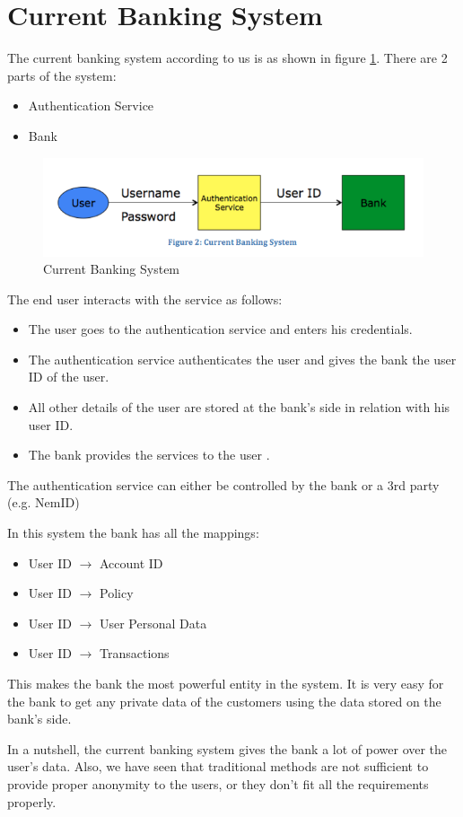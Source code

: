 \section{Current Banking System}
The current banking system according to us is as shown in figure \ref{fig:Current}. There are 2 parts of the system:
\begin{itemize}
	\item Authentication Service 
	\item Bank
\end{itemize}
\begin{figure}[h]
	\centering
	\includegraphics[width=\textwidth]{figures/Current}
	\caption{Current Banking System}
	\label{fig:Current}
\end{figure}
The end user interacts with the service as follows:
\begin{itemize}
\item The user goes to the authentication service and enters his credentials.
\item The authentication service authenticates the user and gives the bank the user ID of the user.
\item All other details of the user are stored at the bank's side in relation with his user ID.
\item The bank provides the services to the user .
\end{itemize}
The authentication service can either be controlled by the bank or a 3rd party (e.g. NemID)

In this system the bank has all the mappings:
\begin{itemize}
	\item User ID $\rightarrow$ Account ID
	\item User ID $\rightarrow$ Policy
	\item User ID $\rightarrow$ User Personal Data
	\item User ID $\rightarrow$ Transactions
\end{itemize}
This makes the bank the most powerful entity in the system. It is very easy for the bank to get any private data of the customers using the data stored on the bank's side.

In a nutshell, the current banking system gives the bank a lot of power over the user's data. Also, we have seen that traditional methods are not sufficient to provide proper anonymity to the users, or they don't fit all the requirements properly.